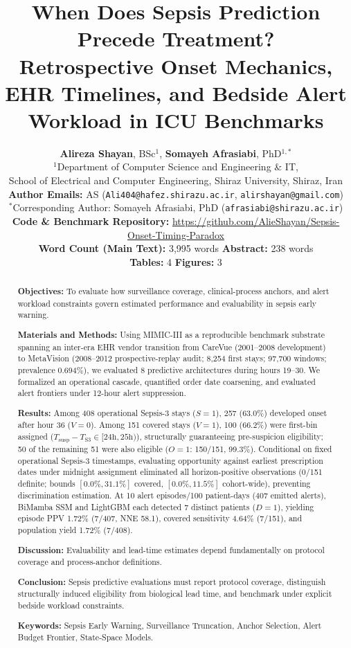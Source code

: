 \documentclass[12pt,a4paper]{article}
\title{\vspace{-1.0em}\textbf{\Large When Does Sepsis Prediction Precede Treatment?\\ Retrospective Onset Mechanics, EHR Timelines, and Bedside Alert Workload in ICU Benchmarks}}
\author{
    \textbf{Alireza Shayan}, BSc$^{1}$, \quad \textbf{Somayeh Afrasiabi}, PhD$^{1,*}$ \\[0.5em]
    $^{1}$Department of Computer Science and Engineering \& IT,\\
    School of Electrical and Computer Engineering, Shiraz University, Shiraz, Iran \\[0.4em]
    \textbf{Author Emails:} AS (\texttt{Ali404@hafez.shirazu.ac.ir}, \texttt{alirshayan@gmail.com}) \\[0.2em]
    $^{*}$Corresponding Author: Somayeh Afrasiabi, PhD (\texttt{afrasiabi@shirazu.ac.ir}) \\[0.4em]
    {\small \textbf{Code \& Benchmark Repository:} \url{https://github.com/AlieShayan/Sepsis-Onset-Timing-Paradox}} \\[0.4em]
    \textbf{Word Count (Main Text):} 3,995 words \quad \textbf{Abstract:} 238 words \\
    \textbf{Tables:} 4 \quad \textbf{Figures:} 3
}
\date{}
\begin{document}
\maketitle

\vspace{-1.0em}
\begin{abstract}
\noindent\textbf{Objectives:} To evaluate how surveillance coverage, clinical-process anchors, and alert workload constraints govern estimated performance and evaluability in sepsis early warning.

\vspace{0.25em}
\noindent\textbf{Materials and Methods:} Using MIMIC-III as a reproducible benchmark substrate spanning an inter-era EHR vendor transition from CareVue (2001--2008 development) to MetaVision (2008--2012 prospective-replay audit; 8,254 first stays; 97,700 windows; prevalence 0.694\%), we evaluated 8 predictive architectures during hours 19--30. We formalized an operational cascade, quantified order date coarsening, and evaluated alert frontiers under 12-hour alert suppression.

\vspace{0.25em}
\noindent\textbf{Results:} Among 408 operational Sepsis-3 stays ($S=1$), 257 (63.0\%) developed onset after hour 36 ($V=0$). Among 151 covered stays ($V=1$), 100 (66.2\%) were first-bin assigned ($T_{\mathrm{susp}} - T_{\mathrm{S3}} \in [24\mathrm{h}, 25\mathrm{h})$), structurally guaranteeing pre-suspicion eligibility; 50 of the remaining 51 were also eligible ($O=1$: 150/151, 99.3\%). Conditional on fixed operational Sepsis-3 timestamps, evaluating opportunity against earliest prescription dates under midnight assignment eliminated all horizon-positive observations (0/151 definite; bounds $[0.0\%, 31.1\%]$ covered, $[0.0\%, 11.5\%]$ cohort-wide), preventing discrimination estimation. At 10 alert episodes/100 patient-days (407 emitted alerts), BiMamba SSM and LightGBM each detected 7 distinct patients ($D=1$), yielding episode PPV 1.72\% (7/407, NNE 58.1), covered sensitivity 4.64\% (7/151), and population yield 1.72\% (7/408).

\vspace{0.25em}
\noindent\textbf{Discussion:} Evaluability and lead-time estimates depend fundamentally on protocol coverage and process-anchor definitions.

\vspace{0.25em}
\noindent\textbf{Conclusion:} Sepsis predictive evaluations must report protocol coverage, distinguish structurally induced eligibility from biological lead time, and benchmark under explicit bedside workload constraints.

\vspace{0.25em}
\noindent\textbf{Keywords:} Sepsis Early Warning, Surveillance Truncation, Anchor Selection, Alert Budget Frontier, State-Space Models.
\end{abstract}
\end{document}

